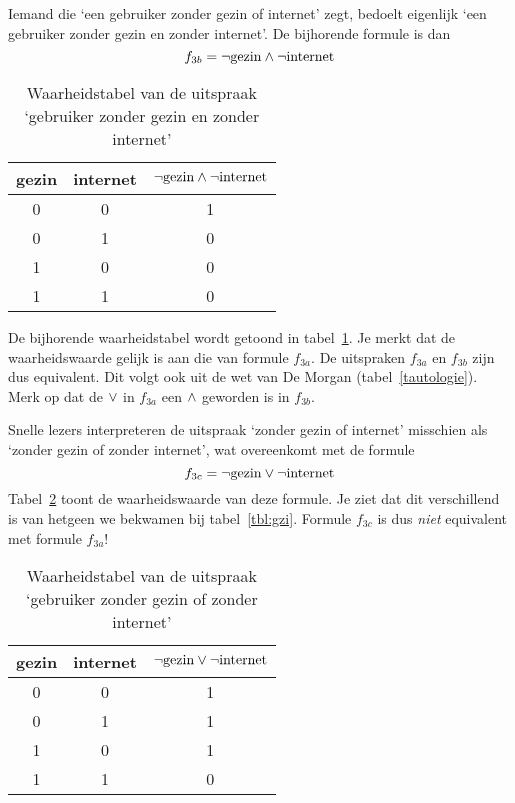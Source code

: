 Iemand die `een gebruiker zonder gezin of internet' zegt, bedoelt eigenlijk `een gebruiker zonder gezin en zonder internet'. De bijhorende formule is dan
\[
f_{3b}=\neg\mathrm{gezin}\wedge\neg \mathrm{internet}
\]
\begin{table}
\centering
\caption{Waarheidstabel van de uitspraak `gebruiker zonder gezin en zonder internet'}
\label{tbl:gzibis}
\begin{tabular}{ccc}
\toprule
gezin&internet&$\neg\mathrm{gezin}\wedge\neg \mathrm{internet}$\\
\midrule
0&0&1\\
0&1&0\\
1&0&0\\
1&1&0\\
\bottomrule
\end{tabular}
\end{table}
De bijhorende waarheidstabel wordt getoond in tabel~\ref{tbl:gzibis}. Je merkt dat de waarheidswaarde gelijk is aan die van formule $f_{3a}$. De uitspraken  $f_{3a}$ en $f_{3b}$ zijn dus equivalent. Dit volgt ook uit de wet van De Morgan (tabel~\ref{tautologie}). Merk op dat de $\vee$ in $f_{3a}$ een $\wedge$ geworden is in $f_{3b}$.

Snelle lezers interpreteren de uitspraak `zonder gezin of internet' misschien als `zonder gezin of zonder internet', wat overeenkomt met de formule
\[
f_{3c}=\neg\mathrm{gezin}\vee\neg \mathrm{internet}
\]
Tabel~\ref{tbl:gzifout} toont de waarheidswaarde van deze formule. Je ziet dat dit verschillend is van hetgeen we bekwamen bij tabel~\ref{tbl:gzi}. Formule $f_{3c}$ is dus \emph{niet} equivalent met formule $f_{3a}$!
\begin{table}
\caption{Waarheidstabel van de uitspraak `gebruiker zonder gezin of zonder internet'}
\label{tbl:gzifout}
\centering
\begin{tabular}{ccc}
\toprule
gezin&internet&$\neg\mathrm{gezin}\vee\neg \mathrm{internet}$\\
\midrule
0&0&1\\
0&1&1\\
1&0&1\\
1&1&0\\
\bottomrule
\end{tabular}
\end{table}

